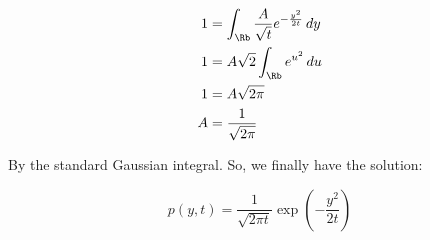 \documentclass{article}
\begin{document}
	\begin{align*}
		1 &= \int_\Rb \frac{A}{\sqrt{t}} e^{-\frac{y^2}{2t}} \, dy \\
		1 &= A\sqrt{2}\int_\Rb e^{u^2} \, du \\
		1 &= A \sqrt{2\pi} \\
		A &= \frac{1}{\sqrt{2\pi}}
	\end{align*}
	
	By the standard Gaussian integral. So, we finally have the solution:
	
	\begin{equation*}
		p(y,t) = \frac{1}{\sqrt{2 \pi t}} \exp\left(-\frac{y^2}{2t}\right)
	\end{equation*}
\end{document}
